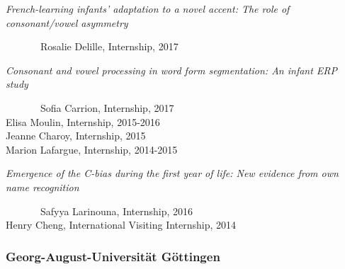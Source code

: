 \documentclass[10pt,a4paper,]{article}
\begin{document}
\emph{French-learning infants' adaptation to a novel accent: The role of consonant/vowel asymmetry}

~~~~~~~Rosalie Delille, Internship, 2017

\emph{Consonant and vowel processing in word form segmentation: An infant ERP study}

~~~~~~~Sofia Carrion, Internship, 2017\\
\hspace*{0.333em}\hspace*{0.333em}\hspace*{0.333em}\hspace*{0.333em}\hspace*{0.333em}\hspace*{0.333em}\hspace*{0.333em}Elisa Moulin, Internship, 2015-2016\\
\hspace*{0.333em}\hspace*{0.333em}\hspace*{0.333em}\hspace*{0.333em}\hspace*{0.333em}\hspace*{0.333em}\hspace*{0.333em}Jeanne Charoy, Internship, 2015\\
\hspace*{0.333em}\hspace*{0.333em}\hspace*{0.333em}\hspace*{0.333em}\hspace*{0.333em}\hspace*{0.333em}\hspace*{0.333em}Marion Lafargue, Internship, 2014-2015

\emph{Emergence of the C-bias during the first year of life: New evidence from own name recognition}

~~~~~~~Safyya Larinouna, Internship, 2016\\
\hspace*{0.333em}\hspace*{0.333em}\hspace*{0.333em}\hspace*{0.333em}\hspace*{0.333em}\hspace*{0.333em}\hspace*{0.333em}Henry Cheng, International Visiting Internship, 2014

\hypertarget{georg-august-universituxe4t-guxf6ttingen}{%
\subsubsection{Georg-August-Universität Göttingen}\label{georg-august-universituxe4t-guxf6ttingen}}
\end{document}
